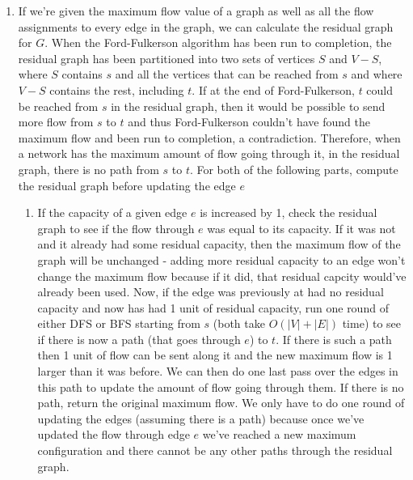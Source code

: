 \documentclass{article}
\begin{document}
\begin{enumerate}
	\item If we're given the maximum flow value of a graph as well as all the flow assignments to every edge in the graph, we can calculate the residual graph for $G$.  When the Ford-Fulkerson algorithm has been run to completion, the residual graph has been partitioned into two sets of vertices $S$ and $V-S$, where $S$ contains $s$ and all the vertices that can be reached from $s$ and where $V-S$ contains the rest, including $t$. If at the end of Ford-Fulkerson, $t$ could be reached from $s$ in the residual graph, then it would be possible to send more flow from $s$ to $t$ and thus Ford-Fulkerson couldn't have found the maximum flow and been run to completion, a contradiction. Therefore, when a network has the maximum amount of flow going through it, in the residual graph, there is no path from $s$ to $t$. For both of the following parts, compute the residual graph before updating the edge $e$
	\begin{enumerate}
		\item If the capacity of a given edge $e$ is increased by 1, check the residual graph to see if the flow through $e$ was equal to its capacity.  If it was not and it already had some residual capacity, then the maximum flow of the graph will be unchanged - adding more residual capacity to an edge won't change the maximum flow because if it did, that residual capcity would've already been used.  Now, if the edge was previously at had no residual capacity and now has had 1 unit of residual capacity, run one round of either DFS or BFS starting from $s$ (both take $O(|V| + |E|)$ time) to see if there is now a path (that goes through $e$) to $t$.  If there is such a path then 1 unit of flow can be sent along it and the new maximum flow is 1 larger than it was before.  We can then do one last pass over the edges in this path to update the amount of flow going through them.  If there is no path, return the original maximum flow.  We only have to do one round of updating the edges (assuming there is a path) because once we've updated the flow through edge $e$ we've reached a new maximum configuration and there cannot be any other paths through the residual graph.  
		

\end{enumerate}
\end{enumerate}
\end{document}
